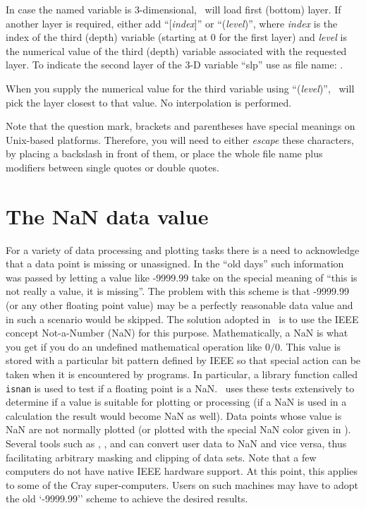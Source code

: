 In case the named variable is 3-dimensional, \GMT\ will load first (bottom) layer. If another
layer is required, either add ``[\emph{index}]'' or ``(\emph{level})'', where \emph{index} is
the index of the third (depth) variable (starting at 0 for the first layer) and \emph{level}
is the numerical value of the third (depth) variable associated with the requested layer.
To indicate the second layer of the 3-D variable ``slp'' use as file name: .

When you supply the numerical value for the third variable using ``(\emph{level})'',
\GMT\ will pick the layer closest to that value. No interpolation is performed.

Note that the question mark, brackets and parentheses have special meanings on Unix-based platforms. Therefore,
you will need to either \emph{escape} these characters, by placing a backslash in front of them, or place the
whole file name plus modifiers between single quotes or double quotes.

\section{The NaN data value}

For a variety of data processing and plotting tasks there is a need to acknowledge that
a data point is missing or unassigned.  In the ``old days'' such information was passed
by letting a value like -9999.99 take on the special meaning of ``this is not really a
value, it is missing''.  The problem with this scheme is that -9999.99 (or any other
floating point value) may be a perfectly reasonable data value and in such a scenario
would be skipped.  The solution adopted in \GMT\ is to use the IEEE concept Not-a-Number
(NaN) for this purpose.  Mathematically, a NaN is what you get if you do an undefined
mathematical operation like $0/0$.  This value is stored with a particular bit pattern
defined by IEEE so that special action can be taken when it is encountered by programs.
In particular, a library function called \texttt{isnan} is used to test if a floating point
is a NaN.  \GMT\ uses these tests extensively to determine if a value is suitable for plotting
or processing (if a NaN is used in a calculation the result would become NaN as well).  Data points
whose value is NaN are not normally plotted (or plotted with the special NaN color given in
).  Several tools such as , , and
 can convert user data to NaN and vice versa, thus facilitating arbitrary
masking and clipping of data sets.  Note that a few computers do not have native IEEE hardware
support.  At this point, this applies to some of the Cray super-computers.  Users on such
machines may have to adopt the old `-9999.99'' scheme to achieve the desired results.
